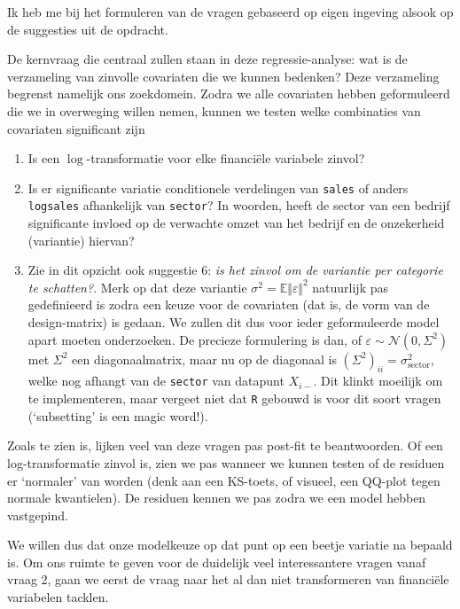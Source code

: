 \documentclass[a4paper, notitlepage]{report}
\begin{document}
  Ik heb me bij het formuleren van de vragen gebaseerd op eigen ingeving alsook op de suggesties uit de opdracht.  
  
  De kernvraag die centraal zullen staan in deze regressie-analyse: wat is de verzameling van zinvolle covariaten die we kunnen bedenken? Deze verzameling begrenst namelijk ons zoekdomein. Zodra we alle covariaten hebben geformuleerd die we in overweging willen nemen, kunnen we testen welke combinaties van covariaten significant zijn
  
\begin{enumerate}
  \item Is een $\log$-transformatie voor elke financi\"ele variabele zinvol?
  
  \item Is er significante variatie conditionele verdelingen van \verb!sales! of anders \verb!logsales! afhankelijk van \verb!sector!? In woorden, heeft de sector van een bedrijf significante invloed op de verwachte omzet van het bedrijf en de onzekerheid (variantie) hiervan?
  
  \item Zie in dit opzicht ook suggestie 6: \emph{is het zinvol om de variantie per categorie te schatten?}. Merk op dat deze variantie $\sigma^2 = \mathbb{E}\Vert \varepsilon \Vert ^2$ natuurlijk pas gedefinieerd is zodra een keuze voor de covariaten (dat is, de vorm van de design-matrix) is gedaan. We zullen dit dus voor ieder geformuleerde model apart moeten onderzoeken. De precieze formulering is dan, of $\varepsilon \sim \mathcal{N}(0,\Sigma^2)$ met $\Sigma^2$ een diagonaalmatrix, maar nu op de diagonaal is $(\Sigma^2)_{ii} = \sigma^2_{\text{sector}}$, welke nog afhangt van de \verb!sector! van datapunt $X_{i-}$. Dit klinkt moeilijk om te implementeren, maar vergeet niet dat \verb!R! gebouwd is voor dit soort vragen (`subsetting' is een magic word!).
\end{enumerate}

  Zoals te zien is, lijken veel van deze vragen pas post-fit te beantwoorden. Of een log-transformatie zinvol is, zien we pas wanneer we kunnen testen of de residuen er `normaler' van worden (denk aan een KS-toets, of visueel, een QQ-plot tegen normale kwantielen). De residuen kennen we pas zodra we een model hebben vastgepind. 
  
  We willen dus dat onze modelkeuze op dat punt op een beetje variatie na bepaald is. Om ons ruimte te geven voor de duidelijk veel interessantere vragen vanaf vraag 2, gaan we eerst de vraag naar het al dan niet transformeren van financi\"ele variabelen tacklen.
  
\end{document}

